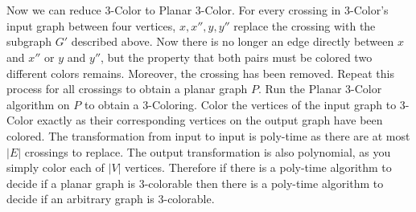 \documentclass[letterpaper,notitlepage,twoside]{article}
\begin{document}
\\\\
Now we can reduce 3-Color to Planar 3-Color. For every crossing in 3-Color's input graph between four vertices, $x, x'', y, y''$ replace the crossing with the subgraph $G'$ described above. Now there is no longer an edge directly between $x$ and $x''$ or $y$ and $y''$, but the property that both pairs must be colored two different colors remains. Moreover, the crossing has been removed. Repeat this process for all crossings to obtain a planar graph $P$. Run the Planar 3-Color algorithm on $P$ to obtain a 3-Coloring. Color the vertices of the input graph to 3-Color exactly as their corresponding vertices on the output graph have been colored. The transformation from input to input is poly-time as there are at most $|E|$ crossings to replace. The output transformation is also polynomial, as you simply color each of $|V|$ vertices. Therefore if there is a poly-time algorithm to decide if a planar graph is 3-colorable then there is a poly-time algorithm to decide if an arbitrary graph is 3-colorable.
\end{document}

